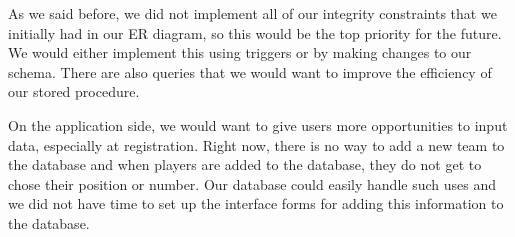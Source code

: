 \documentclass{article}
\begin{document}
As we said before, we did not implement all of our integrity constraints that we initially had in our ER diagram, so this would be the top priority for the future.  We would either implement this using triggers or by making changes to our schema.  There are also queries that we would want to improve the efficiency of our stored procedure. 

On the application side, we would want to give users more opportunities to input data, especially at registration.  Right now, there is no way to add a new team to the database and when players are added to the database, they do not get to chose their position or number.  Our database could easily handle such uses and we did not have time to set up the interface forms for adding this information to the database.
\end{document}
